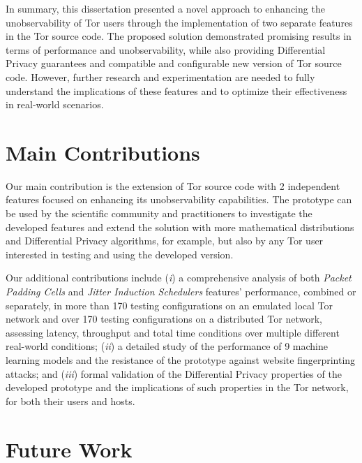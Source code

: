 In summary, this dissertation presented a novel approach to enhancing the unobservability of Tor users through the implementation of two separate features in the Tor source code. The proposed solution demonstrated promising results in terms of performance and unobservability, while also providing Differential Privacy guarantees and compatible and configurable new version of Tor source code. However, further research and experimentation are needed to fully understand the implications of these features and to optimize their effectiveness in real-world scenarios.


\section{Main Contributions}\label{sec:main_conclusions}

Our main contribution is the extension of Tor source code with 2 independent features focused on enhancing its unobservability capabilities. The prototype can be used by the scientific community and practitioners to investigate the developed features and extend the solution with more mathematical distributions and Differential Privacy algorithms, for example, but also by any Tor user interested in testing and using the developed version. 

Our additional contributions include  (\emph{i}) a comprehensive analysis of both \textit{Packet Padding Cells} and \textit{Jitter Induction Schedulers} features' performance, combined or separately, in more than 170 testing configurations on an emulated local Tor network and over 170 testing configurations on a distributed Tor network, assessing latency, throughput and total time conditions over multiple different real-world conditions; (\emph{ii}) a detailed study of the performance of 9 machine learning models and the resistance of the prototype against website fingerprinting attacks; and (\emph{iii}) formal validation of the Differential Privacy properties of the developed prototype and the implications of such properties in the Tor network, for both their users and hosts.

\section{Future Work}\label{sec:future_work}

